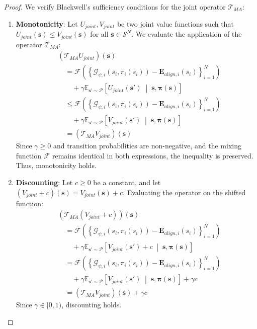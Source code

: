 \documentclass[manuscript, screen, review]{jair}
\begin{document}
\begin{proof}
We verify Blackwell's sufficiency conditions for the joint operator $\mathcal{T}_{MA}$:
\begin{enumerate}
    \item \textbf{Monotonicity}: Let $U_{joint}, V_{joint}$ be two joint value functions such that $U_{joint}(\mathbf{s}) \le V_{joint}(\mathbf{s})$ for all $\mathbf{s} \in \mathcal{S}^N$. We evaluate the application of the operator $\mathcal{T}_{MA}$:
    \begin{align*}
        &\left( \mathcal{T}_{MA} U_{joint} \right)(\mathbf{s}) \\
        &\quad = \mathcal{F}\left( \left\{ \mathcal{G}_{\psi, i}(s_i, \pi_i(s_i)) - \mathbf{E}_{align, i}(s_i) \right\}_{i=1}^N \right) \\
        &\quad\quad + \gamma \mathbb{E}_{\mathbf{s}' \sim \mathcal{P}} \left[ U_{joint}(\mathbf{s}') \;\middle|\; \mathbf{s}, \boldsymbol{\pi}(\mathbf{s}) \right] \\
        &\quad \le \mathcal{F}\left( \left\{ \mathcal{G}_{\psi, i}(s_i, \pi_i(s_i)) - \mathbf{E}_{align, i}(s_i) \right\}_{i=1}^N \right) \\
        &\quad\quad + \gamma \mathbb{E}_{\mathbf{s}' \sim \mathcal{P}} \left[ V_{joint}(\mathbf{s}') \;\middle|\; \mathbf{s}, \boldsymbol{\pi}(\mathbf{s}) \right] \\
        &\quad = \left( \mathcal{T}_{MA} V_{joint} \right)(\mathbf{s})
    \end{align*}
    Since $\gamma \ge 0$ and transition probabilities are non-negative, and the mixing function $\mathcal{F}$ remains identical in both expressions, the inequality is preserved. Thus, monotonicity holds.

    \item \textbf{Discounting}: Let $c \ge 0$ be a constant, and let $(V_{joint} + c)(\mathbf{s}) = V_{joint}(\mathbf{s}) + c$. Evaluating the operator on the shifted function:
    \begin{align*}
        &\left( \mathcal{T}_{MA} (V_{joint} + c) \right)(\mathbf{s}) \\
        &\quad = \mathcal{F}\left( \left\{ \mathcal{G}_{\psi, i}(s_i, \pi_i(s_i)) - \mathbf{E}_{align, i}(s_i) \right\}_{i=1}^N \right) \\
        &\quad\quad + \gamma \mathbb{E}_{\mathbf{s}' \sim \mathcal{P}} \left[ V_{joint}(\mathbf{s}') + c \;\middle|\; \mathbf{s}, \boldsymbol{\pi}(\mathbf{s}) \right] \\
        &\quad = \mathcal{F}\left( \left\{ \mathcal{G}_{\psi, i}(s_i, \pi_i(s_i)) - \mathbf{E}_{align, i}(s_i) \right\}_{i=1}^N \right) \\
        &\quad\quad + \gamma \mathbb{E}_{\mathbf{s}' \sim \mathcal{P}} \left[ V_{joint}(\mathbf{s}') \;\middle|\; \mathbf{s}, \boldsymbol{\pi}(\mathbf{s}) \right] + \gamma c \\
        &\quad = \left( \mathcal{T}_{MA} V_{joint} \right)(\mathbf{s}) + \gamma c
    \end{align*}
    Since $\gamma \in [0, 1)$, discounting holds.
\end{enumerate}


\end{proof}
\end{document}
